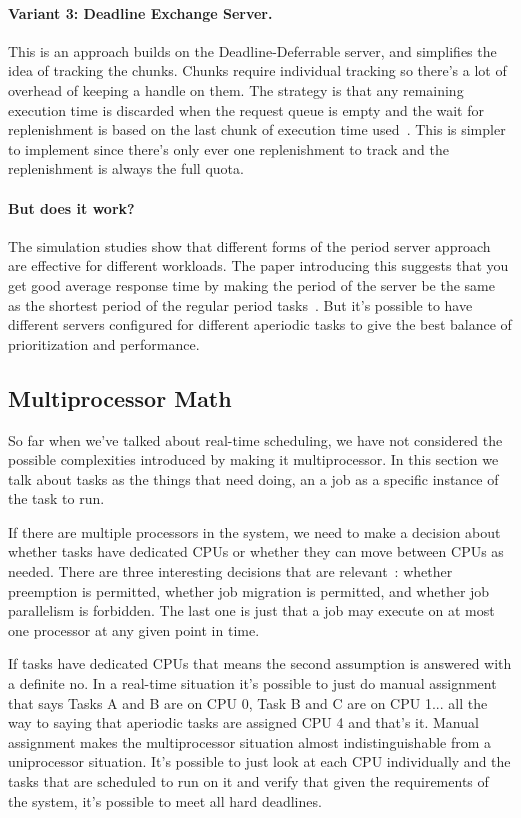 \paragraph{Variant 3: Deadline Exchange Server.}
This is an approach builds on the Deadline-Deferrable server, and simplifies the idea of tracking the chunks. Chunks require individual tracking so there's a lot of overhead of keeping a handle on them. The strategy is that any remaining execution time is discarded when the request queue is empty and the wait for replenishment is based on the last chunk of execution time used~\cite{aperiodic-server}. This is simpler to implement since there's only ever one replenishment to track and the replenishment is always the full quota. 

\paragraph{But does it work?}
The simulation studies show that different forms of the period server approach are effective for different workloads. The paper introducing this suggests that you get good average response time by making the period of the server be the same as the shortest period of the regular period tasks~\cite{aperiodic-server}. But it's possible to have different servers configured for different aperiodic tasks to give the best balance of prioritization and performance.

\subsection*{Multiprocessor Math}

So far when we've talked about real-time scheduling, we have not considered the possible complexities introduced by making it multiprocessor. In this section we talk about tasks as the things that need doing, an a job as a specific instance of the task to run.

If there are multiple processors in the system, we need to make a decision about whether tasks have dedicated CPUs or whether they can move between CPUs as needed. There are three interesting decisions that are relevant~\cite{sa-rt}: whether preemption is permitted, whether job migration is permitted, and whether job parallelism is forbidden. The last one is just that a job may execute on at most one processor at any given point in time.

If tasks have dedicated CPUs that means the second assumption is answered with a definite no.  In a real-time situation it's possible to just do manual assignment that says Tasks A and B are on CPU 0, Task B and C are on CPU 1... all the way to saying that aperiodic tasks are assigned CPU 4 and that's it. Manual assignment makes the multiprocessor situation almost indistinguishable from a uniprocessor situation. It's possible to just look at each CPU individually and the tasks that are scheduled to run on it and verify that given the requirements of the system, it's possible to meet all hard deadlines.

